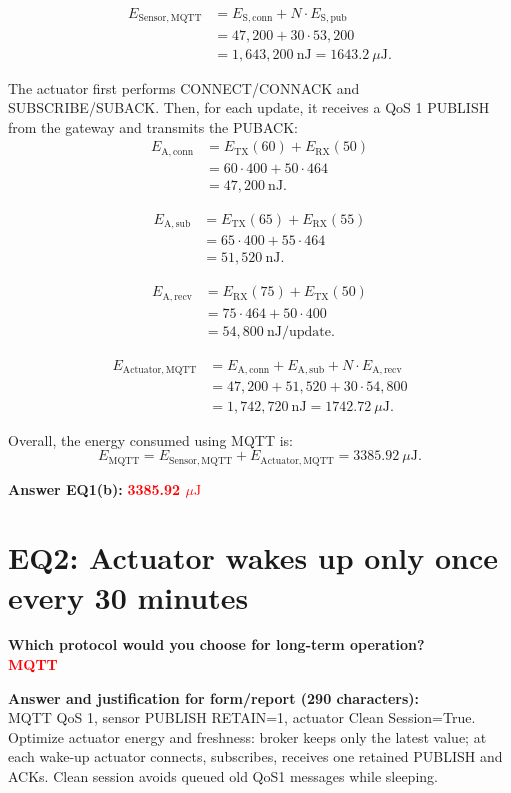 \documentclass[a4paper,11pt]{article}
\newcommand{\answer}[1]{\textbf{\textcolor{red}{#1}}}
\newcommand{\tx}{\mathrm{TX}}
\newcommand{\rx}{\mathrm{RX}}
\newcommand{\uJ}{\mu\mathrm{J}}
\begin{document}
\[
\begin{aligned}
E_{\mathrm{Sensor,MQTT}}
  &= E_{\mathrm{S,conn}} + N \cdot E_{\mathrm{S,pub}} \\
  &= 47{,}200 + 30 \cdot 53{,}200 \\
  &= 1{,}643{,}200\ \mathrm{nJ}
   = 1643.2\ \uJ.
\end{aligned}
\]

The actuator first performs CONNECT/CONNACK and SUBSCRIBE/SUBACK. Then, for
each update, it receives a QoS 1 PUBLISH from the gateway and transmits the
PUBACK:
\[
\begin{aligned}
E_{\mathrm{A,conn}}
  &= E_{\tx}(60) + E_{\rx}(50) \\
  &= 60 \cdot 400 + 50 \cdot 464 \\
  &= 47{,}200\ \mathrm{nJ}.
\end{aligned}
\]

\[
\begin{aligned}
E_{\mathrm{A,sub}}
  &= E_{\tx}(65) + E_{\rx}(55) \\
  &= 65 \cdot 400 + 55 \cdot 464 \\
  &= 51{,}520\ \mathrm{nJ}.
\end{aligned}
\]

\[
\begin{aligned}
E_{\mathrm{A,recv}}
  &= E_{\rx}(75) + E_{\tx}(50) \\
  &= 75 \cdot 464 + 50 \cdot 400 \\
  &= 54{,}800\ \mathrm{nJ/update}.
\end{aligned}
\]

\[
\begin{aligned}
E_{\mathrm{Actuator,MQTT}}
  &= E_{\mathrm{A,conn}} + E_{\mathrm{A,sub}} + N \cdot E_{\mathrm{A,recv}} \\
  &= 47{,}200 + 51{,}520 + 30 \cdot 54{,}800 \\
  &= 1{,}742{,}720\ \mathrm{nJ}
   = 1742.72\ \uJ.
\end{aligned}
\]

Overall, the energy consumed using MQTT is:
\[
  E_{\mathrm{MQTT}}
  = E_{\mathrm{Sensor,MQTT}} + E_{\mathrm{Actuator,MQTT}}
  = 3385.92\ \uJ.
\]

\textbf{Answer EQ1(b):} \answer{3385.92 $\mu\mathrm{J}$}

\section*{EQ2: Actuator wakes up only once every 30 minutes}

\textbf{Which protocol would you choose for long-term operation?} \\
\answer{MQTT}

\textbf{Answer and justification for form/report (290 characters):} \\
MQTT QoS 1, sensor PUBLISH RETAIN=1, actuator Clean Session=True. Optimize actuator energy and freshness: broker keeps only the latest value; at each wake-up actuator connects, subscribes, receives one retained PUBLISH and ACKs. Clean session avoids queued old QoS1 messages while sleeping.
\end{document}
